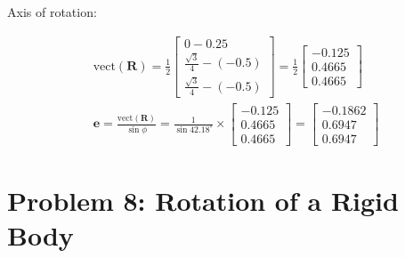 \documentclass[conference]{IEEEtran}
\begin{document}
Axis of rotation:

\begin{align}
&\text{vect}(\mathbf{R}) = \frac{1}{2} 
\begin{bmatrix}
    0 - 0.25 \\
    \frac{\sqrt{3}}{4} - (-0.5) \\
    \frac{\sqrt{3}}{4} - (-0.5)
\end{bmatrix} = 
\frac{1}{2} 
\begin{bmatrix}
    - 0.125 \\
    0.4665 \\
    0.4665
\end{bmatrix} \\
&\mathbf{e} = \frac{\text{vect}(\mathbf{R})}{\sin \phi} = \frac{1}{\sin 42.18^\circ} \times
    \begin{bmatrix}
    - 0.125 \\
    0.4665 \\
    0.4665
\end{bmatrix} = 
\begin{bmatrix}
    -0.1862 \\
    0.6947 \\
    0.6947
\end{bmatrix}
\end{align}

\vspace{10px}

\section{Problem 8: Rotation of a Rigid Body}
\end{document}

